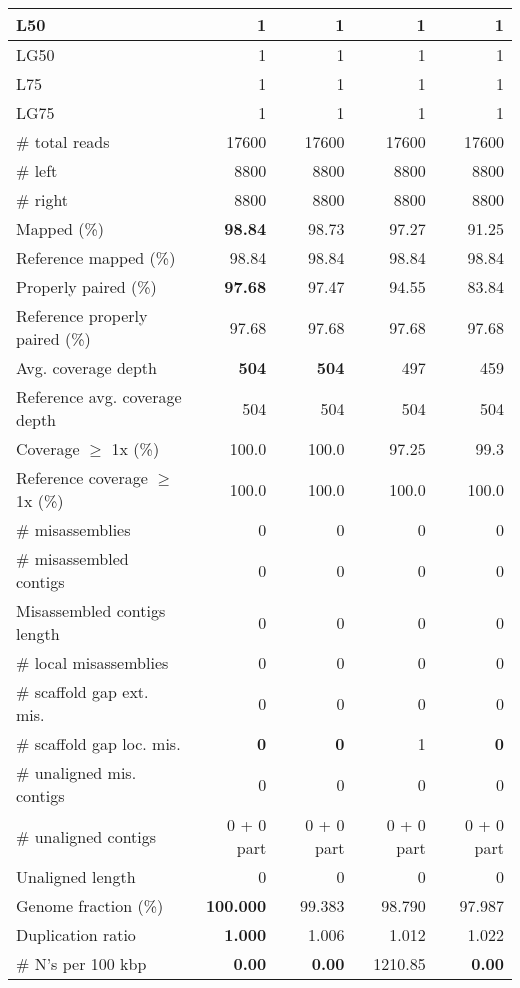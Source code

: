 \documentclass[12pt,a4paper]{article}
\begin{document}
\begin{table}[ht]
\begin{center}
\begin{tabular}{|l*{4}{|r}|}
L50 & 1 & 1 & 1 & 1 \\ \hline
LG50 & 1 & 1 & 1 & 1 \\ \hline
L75 & 1 & 1 & 1 & 1 \\ \hline
LG75 & 1 & 1 & 1 & 1 \\ \hline
\# total reads & 17600 & 17600 & 17600 & 17600 \\ \hline
\# left & 8800 & 8800 & 8800 & 8800 \\ \hline
\# right & 8800 & 8800 & 8800 & 8800 \\ \hline
Mapped (\%) & {\bf 98.84} & 98.73 & 97.27 & 91.25 \\ \hline
Reference mapped (\%) & 98.84 & 98.84 & 98.84 & 98.84 \\ \hline
Properly paired (\%) & {\bf 97.68} & 97.47 & 94.55 & 83.84 \\ \hline
Reference properly paired (\%) & 97.68 & 97.68 & 97.68 & 97.68 \\ \hline
Avg. coverage depth & {\bf 504} & {\bf 504} & 497 & 459 \\ \hline
Reference avg. coverage depth & 504 & 504 & 504 & 504 \\ \hline
Coverage $\geq$ 1x (\%) & 100.0 & 100.0 & 97.25 & 99.3 \\ \hline
Reference coverage $\geq$ 1x (\%) & 100.0 & 100.0 & 100.0 & 100.0 \\ \hline
\# misassemblies & 0 & 0 & 0 & 0 \\ \hline
\# misassembled contigs & 0 & 0 & 0 & 0 \\ \hline
Misassembled contigs length & 0 & 0 & 0 & 0 \\ \hline
\# local misassemblies & 0 & 0 & 0 & 0 \\ \hline
\# scaffold gap ext. mis. & 0 & 0 & 0 & 0 \\ \hline
\# scaffold gap loc. mis. & {\bf 0} & {\bf 0} & 1 & {\bf 0} \\ \hline
\# unaligned mis. contigs & 0 & 0 & 0 & 0 \\ \hline
\# unaligned contigs & 0 + 0 part & 0 + 0 part & 0 + 0 part & 0 + 0 part \\ \hline
Unaligned length & 0 & 0 & 0 & 0 \\ \hline
Genome fraction (\%) & {\bf 100.000} & 99.383 & 98.790 & 97.987 \\ \hline
Duplication ratio & {\bf 1.000} & 1.006 & 1.012 & 1.022 \\ \hline
\# N's per 100 kbp & {\bf 0.00} & {\bf 0.00} & 1210.85 & {\bf 0.00} \\ \hline

\end{tabular}
\end{center}
\end{table}
\end{document}
